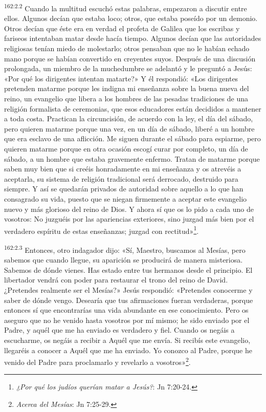\par
\textsuperscript{162:2.2} Cuando la multitud escuchó estas palabras, empezaron a discutir entre ellos. Algunos decían que estaba loco; otros, que estaba poseído por un demonio. Otros decían que éste era en verdad el profeta de Galilea que los escribas y fariseos intentaban matar desde hacía tiempo. Algunos decían que las autoridades religiosas tenían miedo de molestarlo; otros pensaban que no le habían echado mano porque se habían convertido en creyentes suyos. Después de una discusión prolongada, un miembro de la muchedumbre se adelantó y le preguntó a Jesús: «Por qué los dirigentes intentan matarte?» Y él respondió: «Los dirigentes pretenden matarme porque les indigna mi enseñanza sobre la buena nueva del reino, un evangelio que libera a los hombres de las pesadas tradiciones de una religión formalista de ceremonias, que esos educadores están decididos a mantener a toda costa. Practican la circuncisión, de acuerdo con la ley, el día del sábado, pero quieren matarme porque una vez, en un día de sábado, liberé a un hombre que era esclavo de una aflicción. Me siguen durante el sábado para espiarme, pero quieren matarme porque en otra ocasión escogí curar por completo, un día de sábado, a un hombre que estaba gravemente enfermo. Tratan de matarme porque saben muy bien que si creéis honradamente en mi enseñanza y os atrevéis a aceptarla, su sistema de religión tradicional será derrocado, destruido para siempre. Y así se quedarán privados de autoridad sobre aquello a lo que han consagrado su vida, puesto que se niegan firmemente a aceptar este evangelio nuevo y más glorioso del reino de Dios. Y ahora sí que os lo pido a cada uno de vosotros: No juzguéis por las apariencias exteriores, sino juzgad más bien por el verdadero espíritu de estas enseñanzas; juzgad con rectitud»\footnote{\textit{¿Por qué los judíos querían matar a Jesús?}: Jn 7:20-24.}.

\par
\textsuperscript{162:2.3} Entonces, otro indagador dijo: «Sí, Maestro, buscamos al Mesías, pero sabemos que cuando llegue, su aparición se producirá de manera misteriosa. Sabemos de dónde vienes. Has estado entre tus hermanos desde el principio. El libertador vendrá con poder para restaurar el trono del reino de David. ¿Pretendes realmente ser el Mesías?» Jesús respondió: «Pretendes conocerme y saber de dónde vengo. Desearía que tus afirmaciones fueran verdaderas, porque entonces sí que encontrarías una vida abundante en ese conocimiento. Pero os aseguro que no he venido hasta vosotros por mí mismo; he sido enviado por el Padre, y aquél que me ha enviado es verdadero y fiel. Cuando os negáis a escucharme, os negáis a recibir a Aquél que me envía. Si recibís este evangelio, llegaréis a conocer a Aquél que me ha enviado. Yo conozco al Padre, porque he venido del Padre para proclamarlo y revelarlo a vosotros»\footnote{\textit{Acerca del Mesías}: Jn 7:25-29.}.

